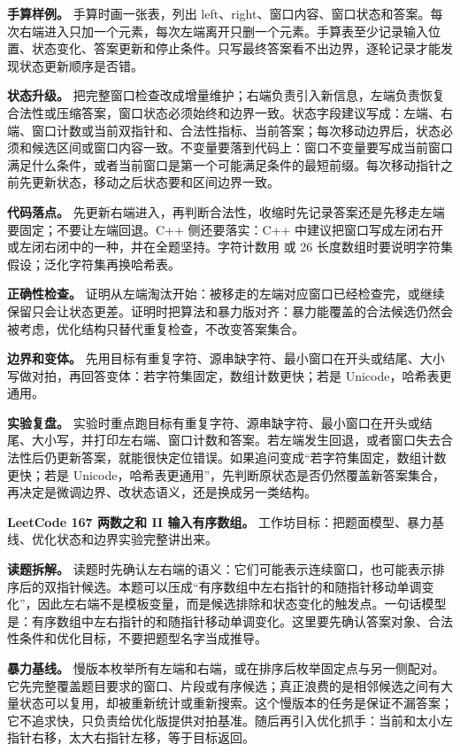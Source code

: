 \textbf{手算样例。} 手算时画一张表，列出 left、right、窗口内容、窗口状态和答案。每次右端进入只加一个元素，每次左端离开只删一个元素。手算表至少记录输入位置、状态变化、答案更新和停止条件。只写最终答案看不出边界，逐轮记录才能发现状态更新顺序是否错。

\textbf{状态升级。} 把完整窗口检查改成增量维护；右端负责引入新信息，左端负责恢复合法性或压缩答案，窗口状态必须始终和边界一致。状态字段建议写成：左端、右端、窗口计数或当前双指针和、合法性指标、当前答案；每次移动边界后，状态必须和候选区间或窗口内容一致。不变量要落到代码上：窗口不变量要写成当前窗口满足什么条件，或者当前窗口是第一个可能满足条件的最短前缀。每次移动指针之前先更新状态，移动之后状态要和区间边界一致。

\textbf{代码落点。} 先更新右端进入，再判断合法性，收缩时先记录答案还是先移走左端要固定；不要让左端回退。C++ 侧还要落实：C++ 中建议把窗口写成左闭右开或左闭右闭中的一种，并在全题坚持。字符计数用  或 26 长度数组时要说明字符集假设；泛化字符集再换哈希表。

\textbf{正确性检查。} 证明从左端淘汰开始：被移走的左端对应窗口已经检查完，或继续保留只会让状态更差。证明时把算法和暴力版对齐：暴力能覆盖的合法候选仍然会被考虑，优化结构只替代重复检查，不改变答案集合。

\textbf{边界和变体。} 先用目标有重复字符、源串缺字符、最小窗口在开头或结尾、大小写做对拍，再回答变体：若字符集固定，数组计数更快；若是 Unicode，哈希表更通用。

\textbf{实验复盘。} 实验时重点跑目标有重复字符、源串缺字符、最小窗口在开头或结尾、大小写，并打印左右端、窗口计数和答案。若左端发生回退，或者窗口失去合法性后仍更新答案，就能很快定位错误。如果追问变成“若字符集固定，数组计数更快；若是 Unicode，哈希表更通用”，先判断原状态是否仍然覆盖新答案集合，再决定是微调边界、改状态语义，还是换成另一类结构。

\noindent\textbf{LeetCode 167 两数之和 II 输入有序数组。} 工作坊目标：把题面模型、暴力基线、优化状态和边界实验完整讲出来。

\textbf{读题拆解。} 读题时先确认左右端的语义：它们可能表示连续窗口，也可能表示排序后的双指针候选。本题可以压成“有序数组中左右指针的和随指针移动单调变化”，因此左右端不是模板变量，而是候选排除和状态变化的触发点。一句话模型是：有序数组中左右指针的和随指针移动单调变化。这里要先确认答案对象、合法性条件和优化目标，不要把题型名字当成推导。

\textbf{暴力基线。} 慢版本枚举所有左端和右端，或在排序后枚举固定点与另一侧配对。它先完整覆盖题目要求的窗口、片段或有序候选；真正浪费的是相邻候选之间有大量状态可以复用，却被重新统计或重新搜索。这个慢版本的任务是保证不漏答案；它不追求快，只负责给优化版提供对拍基准。随后再引入优化抓手：当前和太小左指针右移，太大右指针左移，等于目标返回。

